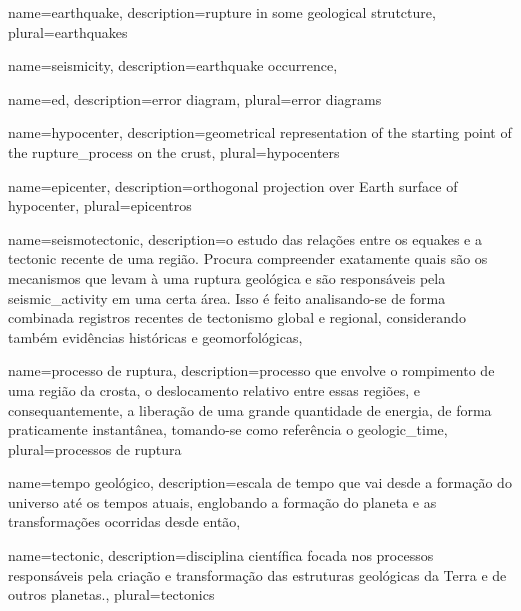 {
	name={earthquake},
	description={rupture in some geological strutcture},
	plural={earthquakes}
}

{
	name={seismicity},
	description={earthquake occurrence},
}

{
	name={\gls{ed}},
	description={error diagram},
	plural={error diagrams}
}


{
	name={hypocenter},
	description={geometrical representation of the starting point of the \gls{rupture_process} on the \gls{crust}},
	plural={hypocenters}
}

{
	name={epicenter},
	description={orthogonal projection over Earth surface of \gls{hypocenter}},
	plural={epicentros}
}


{
	name={seismotectonic},
	description={o estudo das relações entre os \glspl{equake} e a \gls{tectonic} recente de uma região.
				 Procura compreender exatamente quais são os mecanismos que levam à uma ruptura geológica 
				 e são responsáveis pela
				 \gls{seismic_activity} em uma certa área. Isso é feito analisando-se de forma combinada 
				 registros recentes de tectonismo global e regional, 
				 considerando também evidências históricas e geomorfológicas},
}


{
	name={processo de ruptura},
	description={processo que envolve o rompimento de uma região da crosta,
			o deslocamento relativo entre essas regiões, e consequantemente,
			a liberação de uma grande quantidade de energia, de forma praticamente
			instantânea, tomando-se como referência o \gls{geologic_time}},
	plural={processos de ruptura}
}


{
	name={tempo geológico},
	description={escala de tempo que vai desde a formação do universo até os tempos atuais,
				englobando a formação do planeta e as transformações ocorridas desde então},
}


{
	name={tectonic},
	description={disciplina científica focada nos processos respons\'aveis 
				 pela cria\c{c}\~ao e transforma\c{c}\~ao das estruturas geológicas da Terra e de outros planetas.},
	plural={tectonics}
}




